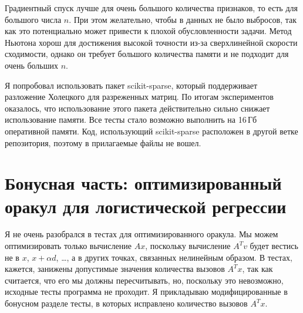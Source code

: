 \documentclass[notitlepage]{article}
\begin{document}
Градиентный спуск лучше для очень большого количества признаков, то есть для большого числа $n$.
При этом желательно, чтобы в данных не было выбросов, так как это потенциально может привести к плохой обусловленности задачи.
Метод Ньютона хорош для достижения высокой точности из-за сверхлинейной скорости сходимости, однако он требует 
большого количества памяти и не подходит для очень больших $n$.

Я попробовал использовать пакет scikit-sparse, который поддерживает разложение Холецкого для разреженных матриц.
По итогам экспериментов оказалось, что использование этого пакета действительно сильно снижает использование памяти.
Все тесты стало возможно выполнить на 16\,Гб оперативной памяти.
Код, использующий scikit-sparse расположен в другой ветке репозитория, поэтому в прилагаемые файлы не вошел.

\section*{Бонусная часть: оптимизированный оракул для логистической регрессии}
Я не очень разобрался в тестах для оптимизированного оракула.
Мы можем оптимизировать только вычисление $Ax$, поскольку вычисление $A^T v$ будет вестись не в $x$, $x + \alpha d$, \dots, а в 
других точках, связанных нелинейным образом. 
В тестах, кажется, занижены допустимые значения количества вызовов $A^T x$, так как считается, что его мы должны пересчитывать,
но, поскольку это невозможно, исходные тесты программа не проходит. Я прикладываю модифицированные в бонусном разделе тесты, в которых
исправлено количество вызовов $A^T x$.
\end{document}
